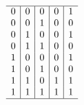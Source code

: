 {{\begin{practices}
\begin{enumerate}[A.]
{\begin{table}[H]
\[\begin{array}{c|c|c|c|c}
                                \hline
                                0 & 0 & 0 & 0 & 1 \\
                                0 & 0 & 1 & 0 & 0 \\
                                0 & 1 & 0 & 0 & 1 \\
                                0 & 1 & 1 & 0 & 0 \\
                                1 & 0 & 0 & 0 & 1 \\
                                1 & 0 & 1 & 0 & 0 \\
                                1 & 1 & 0 & 1 & 1 \\
                                1 & 1 & 1 & 1 & 1 \\
                                \hline
                            \end{array}
                        \]
                    \end{table}
                }
            \end{enumerate}
        \end{practices}

}}
